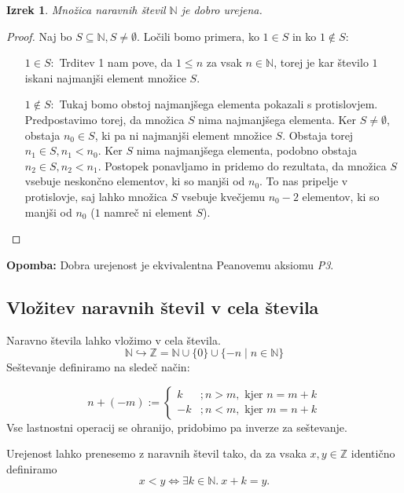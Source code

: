 \documentclass[12pt, a4paper]{article}
\newtheorem{izr}{Izrek}
\newenvironment{opom}[1][]{\par\medskip\noindent \textbf{Opomba: }}{\medskip}
\begin{document}
\begin{izr}
Množica naravnih števil $\mathbb{N}$ je dobro urejena.
\end{izr}

\begin{proof}
Naj bo $S\subseteq \mathbb{N}, S\neq \emptyset$. Ločili bomo primera, ko $1 \in S$ in ko $1\notin S$:
\begin{itemize}
\item[$1\in S:$] Trditev 1 nam pove, da $1\leq n$ za vsak $n\in \mathbb{N}$, torej je kar število $1$ iskani najmanjši element množice $S$.
\item[$1\notin S:$] Tukaj bomo obstoj najmanjšega elementa pokazali s protislovjem. Predpostavimo torej, da množica $S$ nima najmanjšega elementa. Ker $S\neq \emptyset$, obstaja $n_{0}\in S$, ki pa ni najmanjši element množice $S$. Obstaja torej $n_{1} \in S, n_{1} < n_{0}$. Ker $S$ nima najmanjšega elementa, podobno obstaja $n_{2} \in S, n_{2} < n_{1}$. Postopek ponavljamo in pridemo do rezultata, da množica $S$ vsebuje neskončno elementov, ki so manjši od $n_{0}$. To nas pripelje v protislovje, saj lahko množica $S$ vsebuje kvečjemu $n_{0}-2$ elementov, ki so manjši od $n_{0}$ ($1$ namreč ni element $S$).
\end{itemize}
\end{proof}

\begin{opom}
Dobra urejenost je ekvivalentna Peanovemu aksiomu \textit{P3}.
\end{opom}

\subsection{Vložitev naravnih števil v cela števila}

Naravno števila lahko vložimo v cela števila.
$$\mathbb{N} \hookrightarrow \mathbb{Z}=\mathbb{N} \cup \{0\} \cup \{-n \mid n \in \mathbb{N}\}$$
Seštevanje definiramo na sledeč način:

\[ 
n+(-m):=
\begin{cases}
k &; n>m, \text{ kjer } n=m+k \\
-k &; n<m, \text{ kjer } m=n+k
\end{cases}
\]
Vse lastnostni operacij se ohranijo, pridobimo pa inverze za seštevanje.

Urejenost lahko prenesemo z naravnih števil tako, da za vsaka $x,y \in \mathbb{Z}$ identično definiramo
$$x<y \iff \exists k \in \mathbb{N}.\  x+k=y. $$
\end{document}
